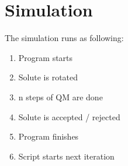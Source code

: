 \documentclass[a4paper,fleqn]{report}
\begin{document}
	\section{Simulation}
	The simulation runs as following:
	\begin{enumerate}
		\item Program starts
		\item Solute is rotated
		\item n steps of QM are done
		\item Solute is accepted / rejected
		\item Program finishes
		\item Script starts next iteration
	\end{enumerate}
	
	

	\newpage
	\begin{spacing}{0.75}
		\label{Referenties}
		\clearpage
		\renewcommand{\bibname}{Referenties}
		
	\end{spacing}
	
	
\end{document}
